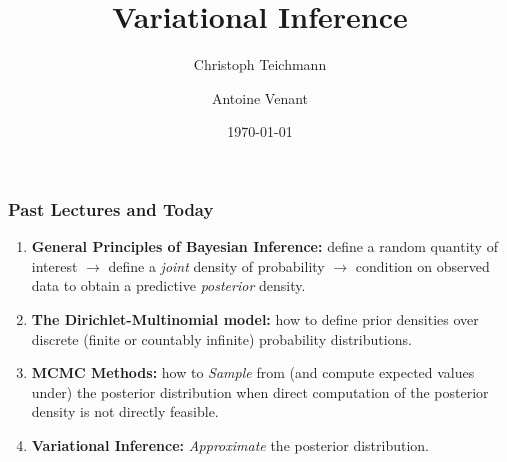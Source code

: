 \documentclass{beamer}
\begin{document}
\title{Variational Inference} 
\author[Antoine Venant]{Christoph Teichmann \and Antoine Venant}
\date{\today}
\maketitle


\begin{frame}
  \frametitle{Past Lectures and Today}
  \begin{enumerate}
  \item \textbf{General Principles of Bayesian Inference:} define a random quantity of interest ${}\rightarrow{}$ define a \emph{joint} density of probability ${}\rightarrow{}$ condition on observed data to obtain a predictive \emph{posterior} density.
  \item \textbf{The Dirichlet-Multinomial model:} how to define prior densities over discrete (finite or countably infinite) probability distributions.
  \item \textbf{MCMC Methods:} how to \emph{Sample} from (and compute expected values under) the posterior distribution when direct computation of the posterior density is not directly feasible.
  \item<2-> \textbf{\alert{Variational Inference:}} \emph{Approximate} the posterior distribution.
  \end{enumerate}
\end{frame}
\end{document}
